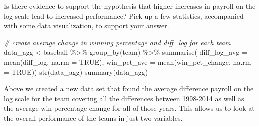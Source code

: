 \documentclass[
]{article}
\newenvironment{Shaded}{\begin{snugshade}}{\end{snugshade}}
\newcommand{\AttributeTok}[1]{\textcolor[rgb]{0.77,0.63,0.00}{#1}}
\newcommand{\CommentTok}[1]{\textcolor[rgb]{0.56,0.35,0.01}{\textit{#1}}}
\newcommand{\ConstantTok}[1]{\textcolor[rgb]{0.00,0.00,0.00}{#1}}
\newcommand{\DecValTok}[1]{\textcolor[rgb]{0.00,0.00,0.81}{#1}}
\newcommand{\FunctionTok}[1]{\textcolor[rgb]{0.00,0.00,0.00}{#1}}
\newcommand{\NormalTok}[1]{#1}
\newcommand{\OtherTok}[1]{\textcolor[rgb]{0.56,0.35,0.01}{#1}}
\newcommand{\SpecialCharTok}[1]{\textcolor[rgb]{0.00,0.00,0.00}{#1}}
\begin{document}
Is there evidence to support the hypothesis that higher increases in
payroll on the log scale lead to increased performance? Pick up a few
statistics, accompanied with some data visualization, to support your
answer.

\begin{Shaded}
\end{Shaded}

\begin{Shaded}
\begin{Highlighting}[]
\CommentTok{\# create average change in winning percentage and diff\_log for each team}
\NormalTok{data\_agg }\OtherTok{\textless{}{-}}\NormalTok{baseball }\SpecialCharTok{\%\textgreater{}\%} 
  \FunctionTok{group\_by}\NormalTok{(team) }\SpecialCharTok{\%\textgreater{}\%}
  \FunctionTok{summarise}\NormalTok{(}
    \AttributeTok{diff\_log\_avg =} \FunctionTok{mean}\NormalTok{(diff\_log, }\AttributeTok{na.rm =} \ConstantTok{TRUE}\NormalTok{), }
    \AttributeTok{win\_pct\_ave =} \FunctionTok{mean}\NormalTok{(win\_pct\_change, }\AttributeTok{na.rm =} \ConstantTok{TRUE}\NormalTok{))}
\FunctionTok{str}\NormalTok{(data\_agg)}
\FunctionTok{summary}\NormalTok{(data\_agg)}
\end{Highlighting}
\end{Shaded}

Above we created a new data set that found the average difference
payroll on the log scale for the team covering all the differences
between 1998-2014 as well as the average win percentage change for all
of those years. This allows us to look at the overall performance of the
teams in just two variables.
\end{document}
